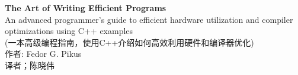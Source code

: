\documentclass[11pt,a4paper,UTF8]{book}
\begin{document}

\begin{center}
\thispagestyle{empty}
\newpage
\thispagestyle{empty}
\huge
\textbf{The Art of Writing Efficient Programs} 
\\[9pt]
\normalsize
An advanced programmer's guide to efficient hardware utilization and compiler optimizations using C++ examples \\ 
(一本高级编程指南，使用C++介绍如何高效利用硬件和编译器优化)
\\[10pt]
\normalsize 
作者: Fedor G. Pikus
\\[8pt]
\normalsize
译者；陈晓伟
\end{center}
\end{document}

